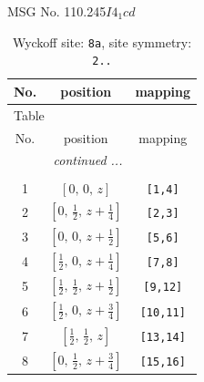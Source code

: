 \documentclass[fleqn,8pt]{jsarticle}
\begin{document}
\setcounter{MaxMatrixCols}{32}

\renewcommand{\tablename}{Table~}
\renewcommand{\figurename}{Figure~}
\begin{center}
\LARGE
MSG No. 110.245\quad$I4_{1}cd$
\end{center}
\renewcommand{\arraystretch}{1.2}
\begin{longtable}{ccc}
\caption{Wyckoff site: {\tt 8a}, site symmetry: {\tt 2..}}
 \\
 \hline \hline
No. & position & mapping \\ \hline \endfirsthead

\multicolumn{2}{l}{\tablename\ \thetable{}} \\
 \hline \hline
No. & position & mapping \\ \hline \endhead

 \hline \hline
\multicolumn{2}{r}{\footnotesize\it continued ...} \\ \endfoot

 \hline \hline
\multicolumn{2}{r}{} \\ \endlastfoot

1 & $\left[ 0,\, 0,\, z \right]$ & {\tt [1,4]} \\ \hline
2 & $\left[ 0,\, \frac{1}{2},\, z + \frac{1}{4} \right]$ & {\tt [2,3]} \\ \hline
3 & $\left[ 0,\, 0,\, z + \frac{1}{2} \right]$ & {\tt [5,6]} \\ \hline
4 & $\left[ \frac{1}{2},\, 0,\, z + \frac{1}{4} \right]$ & {\tt [7,8]} \\ \hline
5 & $\left[ \frac{1}{2},\, \frac{1}{2},\, z + \frac{1}{2} \right]$ & {\tt [9,12]} \\ \hline
6 & $\left[ \frac{1}{2},\, 0,\, z + \frac{3}{4} \right]$ & {\tt [10,11]} \\ \hline
7 & $\left[ \frac{1}{2},\, \frac{1}{2},\, z \right]$ & {\tt [13,14]} \\ \hline
8 & $\left[ 0,\, \frac{1}{2},\, z + \frac{3}{4} \right]$ & {\tt [15,16]} \\
\end{longtable}
\renewcommand{\arraystretch}{1.2}
\end{document}
